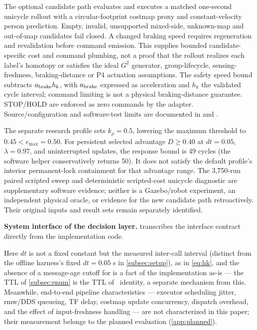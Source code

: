 The optional candidate path evaluates and executes a matched one-second unicycle rollout with a circular-footprint costmap proxy and constant-velocity person prediction. Empty, invalid, unsupported mixed-side, unknown-map and out-of-map candidates fail closed. A changed braking speed requires regeneration and revalidation before command emission. This supplies bounded candidate-specific cost and command plumbing, not a proof that the rollout realizes each label's homotopy or satisfies the ideal $G^2$ generator, group-lifecycle, sensing-freshness, braking-distance or P4 actuation assumptions. The safety speed bound subtracts $a_{\rm brake}h_k$, with $a_{\rm brake}$ expressed as acceleration and $h_k$ the validated cycle interval; command limiting is not a physical braking-distance guarantee. STOP/HOLD are enforced as zero commands by the adapter. Source/configuration and software-test limits are documented in  and .

The separate research profile sets $k_\rho=0.5$, lowering the maximum threshold to $0.45<e_{\max}=0.50$. For persistent selected advantage $D\ge0.40$ at $dt=0.05$, $\lambda=0.97$, and uninterrupted updates, the response bound is 49 cycles (the software helper conservatively returns 50). It does not satisfy the default profile's interior permanent-lock containment for that advantage range. The 3,750-run paired scripted sweep and deterministic scripted-cost unicycle diagnostic are supplementary software evidence; neither is a Gazebo/robot experiment, an independent physical oracle, or evidence for the new candidate path retroactively. Their original inputs and result sets remain separately identified.

\noindent\textbf{System interface of the decision layer.}  transcribes the interface contract directly from the implementation code.



Here $dt$ is not a fixed constant but the measured inter-call interval (distinct from the offline harness's fixed $dt=0.05$ s in \cref{subsec:setup}), as in \eqref{eq:hk}, and the absence of a message-age cutoff for  is a fact of the implementation as-is --- the TTL of \cref{subsec:enum} is the TTL of \Class\ identity, a separate mechanism from this. Meanwhile, end-to-end pipeline characteristics --- executor scheduling jitter, rmw/DDS queueing, TF delay, costmap update concurrency,  dispatch overhead, and the effect of input-freshness handling --- are not characterized in this paper; their measurement belongs to the planned evaluation (\cref{app:planned}).


